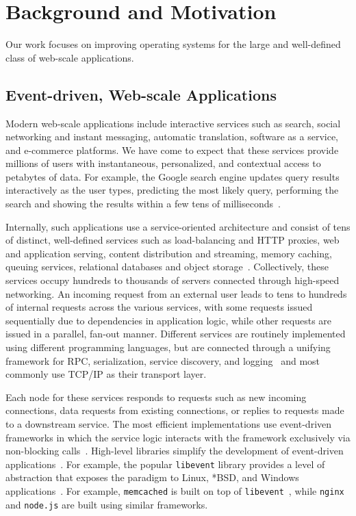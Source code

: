 
\section{Background and Motivation}
\label{sec:motivation}

Our work focuses on improving operating systems for the large and
well-defined class of web-scale applications. 

\subsection{Event-driven, Web-scale Applications}
\label{sec:motivation:web}

Modern web-scale applications include interactive services such as
search, social networking and instant messaging, automatic
translation, software as a service, and e-commerce platforms.
We have come to expect that these services provide millions of users
with instantaneous, personalized, and contextual access to petabytes
of data.  For example, the Google search engine updates query results
interactively as the user types, predicting the most likely query,
performing the search and showing the results within a few tens of
milliseconds~\cite{DBLP:journals/cacm/DeanB13}.

Internally, such applications use a service-oriented architecture and
consist of tens of distinct, well-defined services such as
load-balancing and HTTP proxies, web and application serving, content
distribution and streaming, memory caching, queuing services,
relational databases and object
storage~\cite{Alonso:2010:WSC,DBLP:conf/sosp/DeCandiaHJKLPSVV07,Eriksen:2013:YSF}.
Collectively, these services occupy hundreds to thousands of servers
connected through high-speed networking. An incoming request from an
external user leads to tens to hundreds of internal requests across
the various services, with some requests issued sequentially due to
dependencies in application logic, while other requests are issued in
a parallel, fan-out manner.  Different services are routinely
implemented using different programming languages, but are connected
through a unifying framework for RPC, serialization, service
discovery, and logging~\cite{finagle, protocolbuffers, thrift} and most commonly use TCP/IP as their transport
layer.

Each node for these services responds to requests such as new incoming
connections, data requests from existing connections, or replies to
requests made to a downstream service.  The most efficient
implementations use event-driven frameworks in which the service logic
interacts with the framework exclusively via non-blocking
calls~\cite{DBLP:conf/usenix/PaiDZ99,DBLP:conf/sosp/WelshCB01}.
High-level libraries simplify the development of event-driven
applications~\cite{libev,libuv,provos2003libevent}.  For example, the
popular \texttt{libevent} library provides a level of abstraction that
exposes the paradigm to Linux, *BSD, and Windows
applications~\cite{provos2003libevent}. For example,
\texttt{memcached} is built on top of
\texttt{libevent}~\cite{url:memcached}, while \texttt{nginx} and
\texttt{node.js} are built using similar frameworks.


